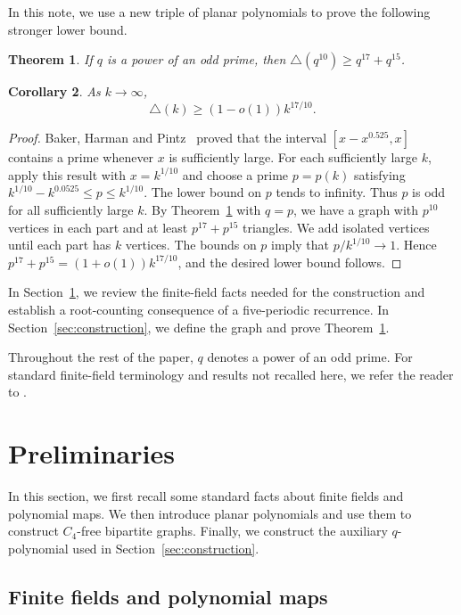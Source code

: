 \documentclass[12pt]{article}
\numberwithin{equation}{section}
\newtheorem{theorem}{Theorem}[section]
\newtheorem{corollary}[theorem]{Corollary}
\theoremstyle{definition}
\begin{document}
In this note, we use a new triple of planar polynomials to prove the following stronger lower bound.

\begin{theorem}\label{thm:main}
If $q$ is a power of an odd prime, then
$\triangle(q^{10})\ge q^{17}+q^{15}$.
\end{theorem}

\begin{corollary}\label{cor:asymptotic}
As $k\to\infty$,
\[
        \triangle(k)\ge (1-o(1))k^{17/10}.
\]
\end{corollary}

\begin{proof}
Baker, Harman and Pintz~\cite{BakerHarmanPintz2001} proved that the interval $[x-x^{0.525},x]$ contains a prime whenever $x$ is sufficiently large. For each sufficiently large $k$, apply this result with $x=k^{1/10}$ and choose a prime $p=p(k)$ satisfying $k^{1/10}-k^{0.0525}\le p\le k^{1/10}$. The lower bound on $p$ tends to infinity. Thus $p$ is odd for all sufficiently large $k$. By Theorem~\ref{thm:main} with $q=p$, we have a graph with $p^{10}$ vertices in each part and at least $p^{17}+p^{15}$ triangles. We add isolated vertices until each part has $k$ vertices. The bounds on $p$ imply that $p/k^{1/10}\to1$. Hence $p^{17}+p^{15}=(1+o(1))k^{17/10}$, and the desired lower bound follows.
\end{proof}

In Section~\ref{sec:preliminaries}, we review the finite-field facts needed for the construction and establish a root-counting consequence of a five-periodic recurrence. In Section~\ref{sec:construction}, we define the graph and prove Theorem~\ref{thm:main}.

Throughout the rest of the paper, $q$ denotes a power of an odd prime. For standard finite-field terminology and results not recalled here, we refer the reader to \cite{LidlNiederreiter1997}.

\section{Preliminaries}\label{sec:preliminaries}

In this section, we first recall some standard facts about finite fields and polynomial maps. We then introduce planar polynomials and use them to construct $C_4$-free bipartite graphs. Finally, we construct the auxiliary $q$-polynomial used in Section~\ref{sec:construction}.

\subsection{Finite fields and polynomial maps}
\end{document}
